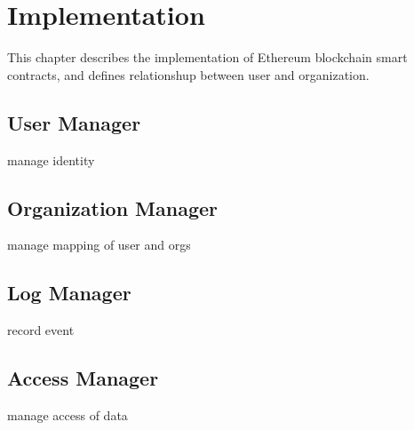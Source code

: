 \chapter{Implementation} 
\label{chapter:implementation}
This chapter describes the implementation of Ethereum blockchain smart contracts, and defines relationshup between user and organization.
\section{User Manager}
manage identity
\section{Organization Manager}
manage mapping of user and orgs
\section{Log Manager}
record event
\section{Access Manager}
manage access of data